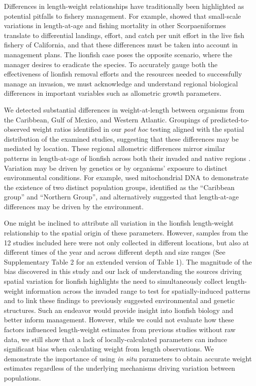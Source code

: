 \documentclass[fleqn,10pt,lineno]{wlpeerj} %
\begin{document}
Differences in length-weight relationships have traditionally been
highlighted as potential pitfalls to fishery management. For example,
\citet{wilson_2012} showed that small-scale variations in length-at-age
and fishing mortality in other Scorpaeniformes translate to differential
landings, effort, and catch per unit effort in the live fish fishery of
California, and that these differences must be taken into account in
management plans. The lionfish case poses the opposite scenario, where
the manager desires to eradicate the species. To accurately gauge both
the effectiveness of lionfish removal efforts and the resources needed
to successfully manage an invasion, we must acknowledge and understand
regional biological differences in important variables such as
allometric growth parameters.

We detected substantial differences in weight-at-length between
organisms from the Caribbean, Gulf of Mexico, and Western Atlantic.
Groupings of predicted-to-observed weight ratios identified in our
\emph{post hoc} testing aligned with the spatial distribution of the
examined studies, suggesting that these differences may be mediated by
location. These regional allometric differences mirror similar patterns in
length-at-age of lionfish across both their invaded and native regions
\citep{pusack_2016}. Variation may be driven by genetics or by
organisms' exposure to distinct environmental conditions. For example,
\citet{betancurr_2011} used mitochondrial DNA to demonstrate the
existence of two distinct population groups, identified as the
``Caribbean group'' and ``Northern Group'', and \citet{fogg_2015}
alternatively suggested that length-at-age differences may be driven by
the environment.

One might be inclined to attribute all variation in the lionfish
length-weight relationship to the spatial origin of these parameters.
However, samples from the 12 studies included here were not only
collected in different locations, but also at different times of the year
and across different depth and size ranges (See Supplementary Table 2
for an extended version of Table 1). The magnitude of the bias
discovered in this study and our lack of understanding the sources
driving spatial variation for lionfish highlights the need to
simultaneously collect length-weight information across the invaded
range to test for spatially-induced patterns and to link these findings
to previously suggested environmental and genetic structures. Such an
endeavor would provide insight into lionfish biology and better inform
management. However, while we could not evaluate how these factors
influenced length-weight estimates from previous studies without raw
data, we still show that a lack of locally-calculated parameters can
induce significant bias when calculating weight from length
observations. We demonstrate the importance of using \emph{in situ}
parameters to obtain accurate weight estimates regardless of the
underlying mechanisms driving variation between populations.
\end{document}
